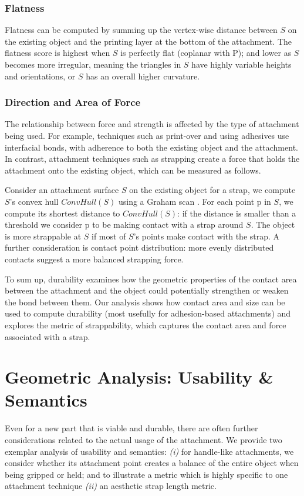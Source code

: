 \subsubsection{Flatness}
Flatness can be computed by summing up the vertex-wise distance between $S$ on the existing object and the printing layer at the bottom of the attachment. The flatness score is highest when $S$ is perfectly flat (coplanar with P); and lower as $S$ becomes more irregular, meaning the triangles in $S$ have highly variable heights and orientations, or $S$ has an overall higher curvature.

\subsubsection{Direction and Area of Force}
The relationship between force and strength is affected by the type of attachment being used. For example, techniques such as print-over and using adhesives use interfacial bonds, with adherence to both the existing object and the attachment. In contrast, attachment techniques such as strapping create a force that holds the attachment onto the existing object, which can be measured as follows.

Consider an attachment surface $S$ on the existing object for a strap, we compute $S$'s convex hull $ConvHull(S)$ using a Graham scan \cite{graham1972efficient}. For each point p in $S$, we compute its shortest distance to $ConvHull(S)$: if the distance is smaller than a threshold we consider p to be making contact with a strap around $S$. The object is more strappable at $S$ if most of $S$'s points make contact with the strap. A further consideration is contact point distribution: more evenly distributed contacts suggest a more balanced strapping force.

To sum up, durability examines how the geometric properties of the contact area between the attachment and the object could potentially strengthen or weaken the bond between them. Our analysis shows how contact area and size can be used to compute durability (most usefully for adhesion-based attachments) and explores the metric of strappability, which captures the contact area and force associated with a strap.

\section{Geometric Analysis: Usability \& Semantics}
Even for a new part that is viable and durable, there are often further considerations related to the actual usage of the attachment. We provide two exemplar analysis of usability and semantics: {\em (i)} for handle-like attachments, we consider whether its attachment point creates a balance of the entire object when being gripped or held; and to illustrate a metric which is highly specific to one attachment technique {\em (ii)} an aesthetic strap length metric.

